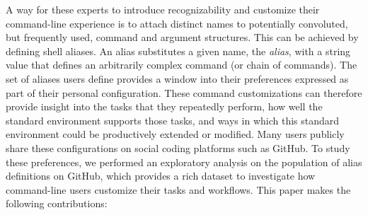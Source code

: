 A way for these experts to introduce recognizability and customize their command-line experience is to attach distinct names to potentially convoluted, but frequently used, command and argument structures.
This can be achieved by defining shell aliases.
An alias substitutes a given name, the \emph{alias}, with a string value that defines an arbitrarily complex command (or chain of commands).
The set of aliases users define provides a window into their preferences expressed as part of their personal configuration.
These command customizations can therefore provide insight into the tasks that they repeatedly perform, how well the standard environment supports those tasks, and ways in which this standard environment could be productively extended or modified.
Many users publicly share these configurations on social coding platforms such as GitHub.
To study these preferences, we performed an exploratory analysis on the population of alias definitions on GitHub, which provides a rich dataset to investigate how command-line users customize their tasks and workflows. 
This paper makes the following contributions:
